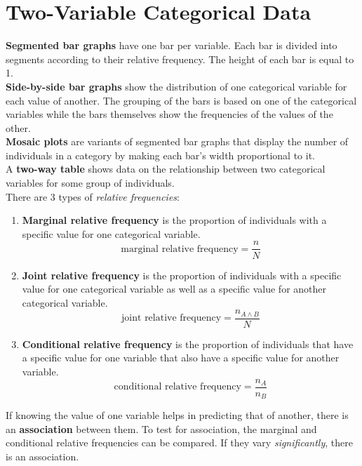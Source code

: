 \documentclass[../AP_Statistics.tex]{subfiles}
\begin{document}
	\chapter{Two-Variable Categorical Data}
		\textbf{Segmented bar graphs} have one bar per variable. Each bar is divided into segments according to their relative frequency. The height of each bar is equal to 1. \\
		\textbf{Side-by-side bar graphs} show the distribution of one categorical variable for each value of another. The grouping of the bars is based on one of the categorical variables while the bars themselves show the frequencies of the values of the other. \\
		\textbf{Mosaic plots} are variants of segmented bar graphs that display the number of individuals in a category by making each bar's width proportional to it. \\
		A \textbf{two-way table} shows data on the relationship between two categorical variables for some group of individuals. \\
		There are 3 types of \emph{relative frequencies}:
		\begin{enumerate}
			\item \textbf{Marginal relative frequency} is the proportion of individuals with a specific value for one categorical variable.
				\[\text{marginal relative frequency} = \frac{n}{N}\]
			\item \textbf{Joint relative frequency} is the proportion of individuals with a specific value for one categorical variable as well as a specific value for another categorical variable.
				\[\text{joint relative frequency} = \frac{n_{A\land B}}{N}\]
			\item \textbf{Conditional relative frequency} is the proportion of individuals that have a specific value for one variable that also have a specific value for another variable.
				\[\text{conditional relative frequency} = \frac{n_A}{n_B}\]
		\end{enumerate}
			If knowing the value of one variable helps in predicting that of another, there is an \textbf{association} between them. To test for association, the marginal and conditional relative frequencies can be compared. If they vary \emph{significantly}, there is an association.
\end{document}
